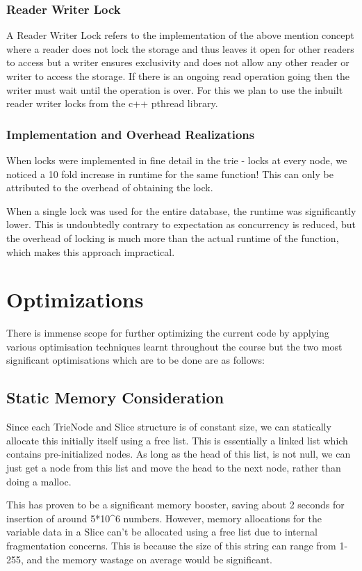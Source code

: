 \documentclass{article}
\begin{document}
\subsubsection{Reader Writer Lock}
A Reader Writer Lock refers to the implementation of the above mention concept where a reader does not lock the storage and thus leaves it open for other readers to access but a writer ensures exclusivity and does not allow any other reader or writer to access the storage. If there is an ongoing read operation going then the writer must wait until the operation is over. For this we plan to use the inbuilt reader writer locks from the c++ pthread library. 

\subsubsection{Implementation and Overhead Realizations}

When locks were implemented in fine detail in the trie - locks at every node, we noticed a 10 fold increase in runtime for the same function! This can only be attributed to the overhead of obtaining the lock.

When a single lock was used for the entire database, the runtime was significantly lower. This is undoubtedly contrary to expectation as concurrency is reduced, but the overhead of locking is much more than the actual runtime of the function, which makes this approach impractical.

\section{Optimizations}
There is immense scope for further optimizing the current code by applying various optimisation techniques learnt throughout the course but the two most significant optimisations which are to be done are as follows:

\subsection{Static Memory Consideration}
Since each TrieNode and Slice structure is of constant size, we can statically allocate this initially itself using a free list. This is essentially a linked list which contains pre-initialized nodes. As long as the head of this list, is not null, we can just get a node from this list and move the head to the next node, rather than doing a malloc.

This has proven to be a significant memory booster, saving about 2 seconds for insertion of around 5*10^6 numbers. However, memory allocations for the variable data in a Slice can't be allocated using a free list due to internal fragmentation concerns. This is because the size of this string can range from 1-255, and the memory wastage on average would be significant.
\end{document}
